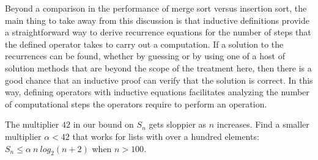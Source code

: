 Beyond a comparison in the performance of merge sort
versus insertion sort, the main thing to take away from this discussion
is that inductive definitions provide a straightforward way to
derive recurrence equations for the number of steps that the defined operator
takes to carry out a computation.
If a solution to the recurrences can be found,
whether by guessing or by using one of a host of solution methods
that are beyond the scope of the treatment here,
then there is a good chance that an
inductive proof
can verify that the solution is correct.
In this way, defining operators with inductive equations
facilitates analyzing the number of computational
steps the operators require to perform an operation.

\begin{ExerciseList}

\Exercise
The multiplier $42$ in our bound on $S_n$ gets sloppier as $n$ increases.
Find a smaller multiplier $\alpha < 42$ that works for lists with 
over a hundred elements:
$S_{n} \leq \alpha~n~log_2(n+2)$ when $n > 100$.

\end{ExerciseList} 